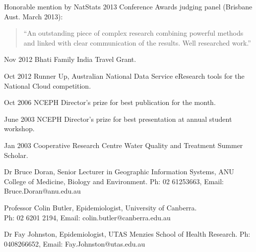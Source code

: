\documentclass[a4paper,11pt]{article}
\begin{document}
\renewcommand{\labelenumi}{\textsc{n}\theenumi.}
\medskip  
\begin{revnumerate}
\item Honorable mention by NatStats 2013 Conference Awards judging panel (Brisbane Aust. March 2013):

\begin{quote}
“An outstanding piece of complex research combining powerful methods and linked with clear communication of the results. Well researched work.”
\end{quote}

\item Nov 2012 Bhati Family India Travel Grant.

\item Oct 2012 Runner Up, Australian National Data Service eResearch tools for the National Cloud competition.

\item Oct 2006 NCEPH Director’s prize for best publication for the month.

\item June 2003 NCEPH Director’s prize for best presentation at annual student workshop.

\item Jan 2003 Cooperative Research Centre Water Quality and Treatment Summer Scholar.
\end{revnumerate}



\renewcommand{\labelenumi}{\textsc{o}\theenumi.}
\begin{revnumerate}
\item Dr Bruce Doran, Senior Lecturer in Geographic Information Systems, ANU College of Medicine, Biology and Environment. Ph: 02 61253663, Email: Bruce.Doran@anu.edu.au

\item Professor Colin Butler, Epidemiologist, University of Canberra. \\ 
Ph: 02 6201 2194, Email: colin.butler@canberra.edu.au


\item Dr Fay Johnston, Epidemiologist, UTAS Menzies School of Health Research. Ph: 0408266652, Email: Fay.Johnston@utas.edu.au
\end{revnumerate}
\end{document}
